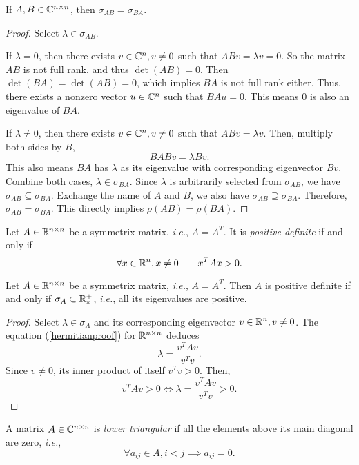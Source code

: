 \begin{theorem}
If \(A,B\in\mathbb{C}^{n\times n}\), then \(\sigma_{AB}=\sigma_{BA}\).
\end{theorem}
\begin{proof}
Select \(\lambda\in\sigma_{AB}\).
\item If \(\lambda=0\), then there exists \(v\in\mathbb{C}^n,v\neq0\) such that \(ABv=\lambda v=0\).
So the matrix $AB$ is not full rank, and thus \(\det(AB)=0\).
Then \(\det(BA)=\det(AB)=0\), which implies $BA$ is not full rank either.
Thus, there exists a nonzero vector \(u\in\mathbb{C}^n\) such that \(BAu=0\).
This means 0 is also an eigenvalue of $BA$.
\item If \(\lambda\neq0\), then there exists \(v\in\mathbb{C}^n,v\neq0\) such that \(ABv=\lambda v\).
Then, multiply both sides by $B$,
\begin{equation*}
BABv=\lambda Bv.
\end{equation*}
This also means \(BA\) has $\lambda$ as its eigenvalue with corresponding eigenvector \(Bv\).
Combine both cases, \(\lambda\in\sigma_{BA}\).
Since $\lambda$ is arbitrarily selected from \(\sigma_{AB}\), we have \(\sigma_{AB}\subseteq\sigma_{BA}\).
Exchange the name of $A$ and $B$, we also have \(\sigma_{AB}\supseteq\sigma_{BA}\).
Therefore, \(\sigma_{AB}=\sigma_{BA}\).
This directly implies \(\rho(AB)=\rho(BA)\).
\end{proof}

\begin{definition}
Let \(A\in\mathbb{R}^{n\times n}\) be a symmetrix matrix, \textit{i.e.}, \(A=A^T\).
It is \emph{positive definite} if and only if
\[ \forall x\in\mathbb{R}^n,x\neq0 \qquad x^TAx>0.  \]
\end{definition}

\begin{theorem}
Let \(A\in\mathbb{R}^{n\times n}\) be a symmetrix matrix, \textit{i.e.}, \(A=A^T\).
Then $A$ is positive definite if and only if \(\sigma_A\subset\mathbb{R}_*^+\), \textit{i.e.}, all its eigenvalues are positive.
\end{theorem}
\begin{proof}
Select \(\lambda\in\sigma_{A}\) and its corresponding eigenvector \(v\in\mathbb{R}^n,v\neq0\).
The equation (\ref{hermitianproof}) for \(\mathbb{R}^{n\times n}\) deduces
\[ \lambda=\frac{v^T Av}{v^Tv}. \]
Since \(v\neq0\), its inner product of itself \(v^Tv>0\).
Then,
\[ v^TAv>0 \iff \lambda=\frac{v^TAv}{v^Tv}>0. \]
\end{proof}


\begin{definition}
A matrix \(A\in\mathbb{C}^{n\times n}\) is \emph{lower triangular} if all the elements above its main diagonal are zero, \textit{i.e.},
\[ \forall a_{ij}\in A, i<j\implies a_{ij}=0. \]
\end{definition}


